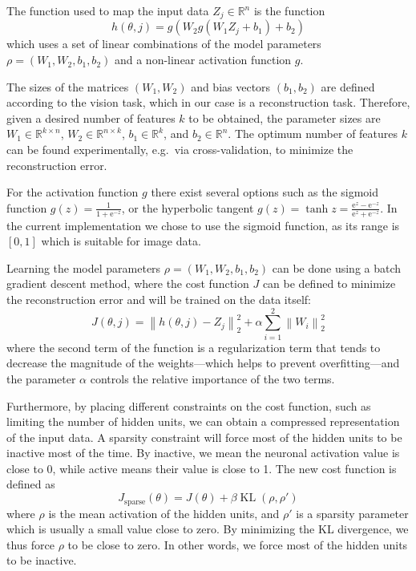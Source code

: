 \documentclass[conference]{IEEEtran}
\newcommand{\KL}{\mathop{\textrm{KL}}}
\begin{document}
The function used to map the input data $Z_j\in \mathbb{R}^n$ is the function
\begin{equation}
 h(\theta,j)= g(W_2 g(W_1 Z_j+b_1)+b_2)
\end{equation}
which uses a set of linear combinations of the model parameters 
$\rho=(W_1,W_2,b_1,b_2)$ and a non-linear activation function $g$.

The sizes of the matrices $(W_1,W_2)$ and bias vectors $(b_1,b_2)$ are defined according to the vision task, which in our case is a reconstruction task. Therefore, given a desired number of features $k$ to be obtained, the parameter sizes are $W_1 \in \mathbb{R}^{k\times n} $, $W_2 \in \mathbb{R}^{n\times k}$, $b_1\in \mathbb{R}^k$, and $b_2 \in \mathbb{R}^n$. The optimum number of features $k$ can be found experimentally, e.g.\ via cross-validation, to minimize the reconstruction error.

For the activation function $g$ there exist several options such as the sigmoid function $g(z)=\frac{1}{1+\text{e}^{-z}}$, or the hyperbolic tangent $  g(z)=\tanh z=\frac{\text{e}^z-\text{e}^{-z}}{\text{e}^z+\text{e}^{-z}}$.
In the current implementation we chose to use the sigmoid function, as its range is $[0,1]$ which is suitable for image data.

Learning the model parameters $\rho=(W_1,W_2,b_1,b_2)$ can be done using a batch gradient descent method, where the cost function $J$ can be defined to minimize the reconstruction error and will be trained on the data itself:
\begin{equation}
   J(\theta,j)=\left\|h(\theta,j)-Z_j\right\|_2^2 + \alpha\sum_{i=1}^{2} \left\|W_i\right\|_2^2
\end{equation}
where the second term of the function is a regularization term that tends to decrease the magnitude of the weights---which helps to prevent overfitting---and the parameter $\alpha$ controls the relative importance of the two terms.
 
Furthermore, by placing different constraints on the cost function, such as limiting the number of hidden units, we can obtain a compressed representation of the input data. A sparsity constraint will force most of the hidden units to be inactive most of the time. By inactive, we mean the neuronal activation value is close to 0, while active means their value is close to 1. The new cost function is defined as
\begin{equation}
J_{\textrm{sparse}}(\theta)=J(\theta)+\beta \KL(\rho,\rho')
\end{equation}
where $\rho$ is the mean activation of the hidden units, and $\rho'$ is a sparsity parameter which is usually a small value close to zero. By minimizing the KL divergence, we thus force $\rho$ to be close to zero. In other words, we force most of the hidden units to be inactive.
\end{document}
